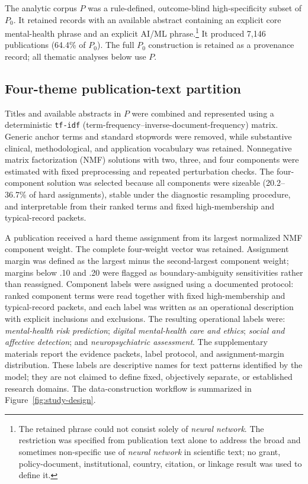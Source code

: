 \documentclass[12pt]{article}
\begin{document}
The analytic corpus $P$ was a rule-defined, outcome-blind high-specificity subset of $P_0$. It retained records with an available abstract containing an explicit core mental-health phrase and an explicit AI/ML phrase.\footnote{The retained phrase could not consist solely of \emph{neural network}. The restriction was specified from publication text alone to address the broad and sometimes non-specific use of \emph{neural network} in scientific text; no grant, policy-document, institutional, country, citation, or linkage result was used to define it.} It produced 7,146 publications (64.4\% of $P_0$). The full $P_0$ construction is retained as a provenance record; all thematic analyses below use $P$.

\subsection{Four-theme publication-text partition}

Titles and available abstracts in $P$ were combined and represented using a deterministic \texttt{tf-idf} (term-frequency--inverse-document-frequency) matrix. Generic anchor terms and standard stopwords were removed, while substantive clinical, methodological, and application vocabulary was retained. Nonnegative matrix factorization (NMF) solutions with two, three, and four components were estimated with fixed preprocessing and repeated perturbation checks. The four-component solution was selected because all components were sizeable (20.2--36.7\% of hard assignments), stable under the diagnostic resampling procedure, and interpretable from their ranked terms and fixed high-membership and typical-record packets.

A publication received a hard theme assignment from its largest normalized NMF component weight. The complete four-weight vector was retained. Assignment margin was defined as the largest minus the second-largest component weight; margins below .10 and .20 were flagged as boundary-ambiguity sensitivities rather than reassigned. Component labels were assigned using a documented protocol: ranked component terms were read together with fixed high-membership and typical-record packets, and each label was written as an operational description with explicit inclusions and exclusions. The resulting operational labels were: \emph{mental-health risk prediction}; \emph{digital mental-health care and ethics}; \emph{social and affective detection}; and \emph{neuropsychiatric assessment}. The supplementary materials report the evidence packets, label protocol, and assignment-margin distribution. These labels are descriptive names for text patterns identified by the model; they are not claimed to define fixed, objectively separate, or established research domains. The data-construction workflow is summarized in Figure~\ref{fig:study-design}.
\end{document}
